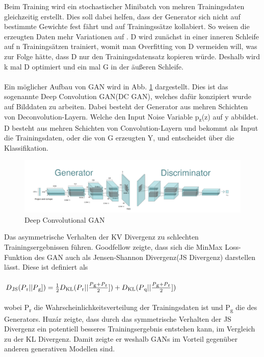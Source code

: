 \documentclass{llncs}
\begin{document}
Beim Training wird ein stochastischer Minibatch von mehren Trainingsdaten gleichzeitig erstellt. Dies soll dabei helfen, dass der Generator sich nicht auf bestimmte Gewichte fest fährt und auf Trainingssätze kollabiert. So weisen die erzeugten Daten mehr Variationen auf \cite{improvingan}. D wird zunächst in einer inneren Schleife auf n Trainingsätzen trainiert, womit man Overfitting von D vermeiden will, was zur Folge hätte, dass D nur den Trainingsdatensatz kopieren würde. Deshalb wird k mal D optimiert und ein mal G in der äußeren Schleife. 
\\\\
Ein möglicher Aufbau von GAN wird in Abb. \ref{fig:Bild21} dargestellt. Dies ist das sogenannte Deep Convolution GAN(DC GAN), welches dafür konzipiert wurde auf Bilddaten zu arbeiten. Dabei besteht der Generator aus mehren Schichten von Deconvolution-Layern. Welche den Input Noise Variable p\textsubscript{z}(z) auf y abbildet. D besteht aus mehren Schichten von Convolution-Layern und bekommt als Input die Trainingsdaten, oder die von G erzeugten Y, und entscheidet über die Klassifikation\cite{dcgan}.

\begin{figure}[htbp] 
	\centering
	\includegraphics[width=1.0\textwidth]{dcgan1.png}
	\caption{Deep Convolutional GAN\protect\cite{dc-gan_book}}
	\label{fig:Bild21}
\end{figure}

Das asymmetrische Verhalten der KV Divergenz zu schlechten Trainingsergebnissen führen. Goodfellow \cite{goodfellow2014} zeigte, dass sich die MinMax Loss-Funktion des GAN auch als Jensen-Shannon Divergenz(JS Divergenz) darstellen lässt. Diese ist definiert als
\\\\
\begin{math} D\textsubscript{JS}(P\textsubscript{r}|| P\textsubscript{g}])=\frac{1}{2}D\textsubscript{KL}(P\textsubscript{r}|| \frac{P\textsubscript{g}+P\textsubscript{r}}{2}])+D\textsubscript{KL}(P\textsubscript{q}|| \frac{P\textsubscript{g}+P\textsubscript{r}}{2}])  
\end{math}
\\\\
wobei P\textsubscript{r} die Wahrscheinlichkeitsverteilung der Trainingsdaten ist und P\textsubscript{g} die des Generators. Huzár \cite{sha} zeigte, dass durch das symmetrische Verhalten der JS Divergenz ein potentiell besseres Trainingsergebnis entstehen kann, im Vergleich zu der KL Divergenz. Damit zeigte er weshalb GANs im Vorteil gegenüber anderen generativen Modellen sind.
\newpage
\end{document}
